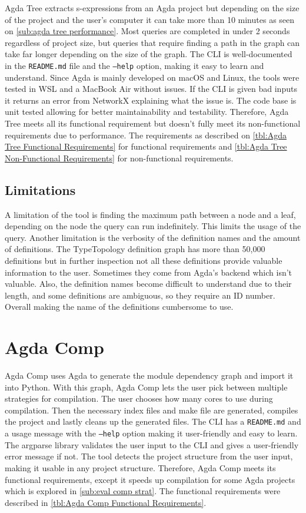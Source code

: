 Agda Tree extracts s-expressions from an Agda project but depending on the
size of the project and the user's computer it can take more than 10 minutes as
seen on \cref{sub:agda tree performance}. Most queries are completed in under 2
seconds regardless of project size, but queries that require finding a path in
the graph can take far longer depending on the size of the graph. The CLI is
well-documented in the \texttt{README.md} file and the \texttt{--help} option,
making it easy to learn and understand. Since Agda is mainly developed on macOS
and Linux, the tools were tested in WSL and a MacBook Air without issues. If
the CLI is given bad inputs it returns an error from NetworkX explaining what
the issue is. The code base is unit tested allowing for better maintainability
and testability. Therefore, Agda Tree meets all its functional requirement but
doesn't fully meet its non-functional requirements due to performance. The
requirements as described on \cref{tbl:Agda Tree Functional Requirements} for
functional requirements and \cref{tbl:Agda Tree Non-Functional Requirements}
for non-functional requirements.

\subsection{Limitations}

A limitation of the tool is finding the maximum path between a node and a leaf,
depending on the node the query can run indefinitely. This limits the usage of
the query. Another limitation is the verbosity of the definition names and the
amount of definitions. The TypeTopology definition graph has more than 50,000
definitions but in further inspection not all these definitions provide
valuable information to the user. Sometimes they come from Agda's backend which
isn't valuable. Also, the definition names become difficult to understand due
to their length, and some definitions are ambiguous, so they require an ID
number. Overall making the name of the definitions cumbersome to use.


\section{Agda Comp} \label{sec:eval agda comp}

Agda Comp uses Agda to generate the module dependency graph and import it into
Python. With this graph, Agda Comp lets the user pick between multiple
strategies for compilation. The user chooses how many cores to use during
compilation. Then the necessary index files and make file are generated,
compiles the project and lastly cleans up the generated files. The CLI has a
\texttt{README.md} and a usage message with the \texttt{--help} option making
it user-friendly and easy to learn. The argparse library validates the user
input to the CLI and gives a user-friendly error message if not. The tool
detects the project structure from the user input, making
it usable in any project structure. Therefore, Agda Comp meets its
functional requirements, except it speeds up compilation for some Agda projects
which is explored in \cref{sub:eval comp strat}. The functional
requirements were described in \cref{tbl:Agda Comp Functional Requirements}.


